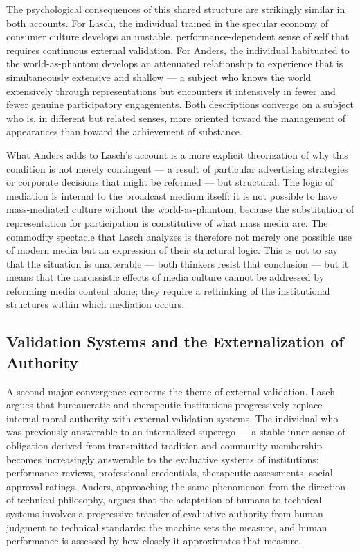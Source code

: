 \documentclass[12pt]{memoir}
\begin{document}
The psychological consequences of this shared structure are strikingly similar in both accounts.
For Lasch, the individual trained in the specular economy of consumer culture develops an
unstable, performance-dependent sense of self that requires continuous external validation. For
Anders, the individual habituated to the world-as-phantom develops an attenuated relationship to
experience that is simultaneously extensive and shallow — a subject who knows the world
extensively through representations but encounters it intensively in fewer and fewer genuine
participatory engagements. Both descriptions converge on a subject who is, in different but
related senses, more oriented toward the management of appearances than toward the achievement
of substance.

What Anders adds to Lasch's account is a more explicit theorization of why this condition is
not merely contingent — a result of particular advertising strategies or corporate decisions that
might be reformed — but structural. The logic of mediation is internal to the broadcast medium
itself: it is not possible to have mass-mediated culture without the world-as-phantom, because
the substitution of representation for participation is constitutive of what mass media are. The
commodity spectacle that Lasch analyzes is therefore not merely one possible use of modern
media but an expression of their structural logic. This is not to say that the situation is
unalterable — both thinkers resist that conclusion — but it means that the narcissistic effects
of media culture cannot be addressed by reforming media content alone; they require a rethinking
of the institutional structures within which mediation occurs.

\subsection{Validation Systems and the Externalization of Authority}

A second major convergence concerns the theme of external validation. Lasch argues that
bureaucratic and therapeutic institutions progressively replace internal moral authority with
external validation systems. The individual who was previously answerable to an internalized
superego — a stable inner sense of obligation derived from transmitted tradition and community
membership — becomes increasingly answerable to the evaluative systems of institutions:
performance reviews, professional credentials, therapeutic assessments, social approval
ratings. Anders, approaching the same phenomenon from the direction of technical philosophy,
argues that the adaptation of humans to technical systems involves a progressive transfer of
evaluative authority from human judgment to technical standards: the machine sets the measure,
and human performance is assessed by how closely it approximates that measure.
\end{document}
